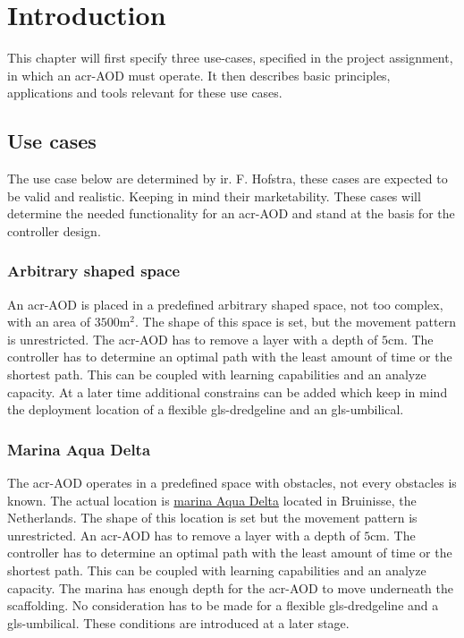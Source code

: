 \chapter{Introduction}\label{chap:Introduction}


 This chapter will first specify three use-cases, specified in the project assignment, in which an \gls{acr-AOD} must operate. It then describes basic principles, applications and tools relevant for these use cases.

\section{Use cases}\label{sec:usecases}
The use case below are determined by ir. F. Hofstra, these cases are expected to be valid and realistic. Keeping in mind their marketability. These cases will determine the needed functionality for an \gls{acr-AOD} and stand at the basis for the controller design.

\subsection{Arbitrary shaped space}\label{sec:usecase1}
An \gls{acr-AOD} is placed in a predefined arbitrary shaped space, not too complex, with an area of \( 3500 \si{\square\metre} \). The shape of this space is set, but the movement pattern is unrestricted. The \gls{acr-AOD} has to remove a layer with a depth of \( 5 \si{\cm} \). The controller has to determine an optimal path with the least amount of time or the shortest path. This can be coupled with learning capabilities and an analyze capacity. At a later time additional constrains can be added which keep in mind the deployment location of a flexible \gls{gls-dredgeline} and an \gls{gls-umbilical}.

\subsection{Marina Aqua Delta}\label{sec:usecase2}
The \gls{acr-AOD} operates in a predefined space with obstacles, not every obstacles is known. The actual location is \href{https://www.google.nl/maps/place/Jachthaven+Bruinisse/@51.6712838,4.0824101,15z/data=!4m2!3m1!1s0x0:0x9c840ab80bde39c8}{marina Aqua Delta} located in Bruinisse, the Netherlands. The shape of this location is set but the movement pattern is unrestricted. An \gls{acr-AOD}  has to remove a layer with a depth of \( 5 \si{\cm} \). The controller has to determine an optimal path with the least amount of time or the shortest path. This can be coupled with learning capabilities and an analyze capacity. The marina has enough depth for the \gls{acr-AOD} to move underneath the scaffolding.
No consideration has to be made for a flexible \gls{gls-dredgeline} and a \gls{gls-umbilical}. These conditions are introduced at a later stage.

